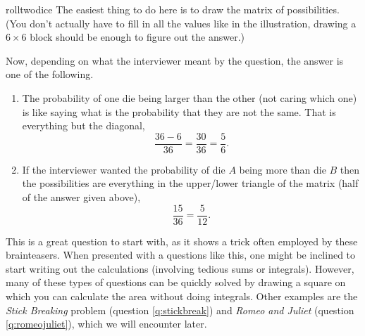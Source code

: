 \begin{answer}{rolltwodice}
The easiest thing to do here is to draw the matrix of possibilities.
(You don't actually have to fill in all the values like in the illustration, drawing a $6 \times 6$ block should be enough to figure out the answer.)
%
\begin{center}
\end{center}
%
Now, depending on what the interviewer meant by the question, the answer is one of the following.
\begin{enumerate}
  \item
The probability of one die being larger than the other (not caring which one) is like saying what is the probability that they are not the same.
That is everything but the diagonal,
\[
  \frac{36- 6}{36} =  \frac{30}{36} = \frac{5}{6}
  \text{.}
\]
  \item
If the interviewer wanted the probability of die $A$ being more than die $B$ then the possibilities are everything in the upper/lower triangle of the matrix (half of the answer given above),
\[
  \frac{15}{36} = \frac{5}{12}
  \text{.}
\]
\end{enumerate}

This is a great question to start with, as it shows a trick often employed by these brainteasers.
When presented with a questions like this, one might be inclined to start writing out the calculations (involving tedious sums or integrals).
However, many of these types of questions can be quickly solved by drawing a square on which you can calculate the area without doing integrals.
Other examples are the
\emph{Stick Breaking} problem (question \ref{q:stickbreak})
and
\emph{Romeo and Juliet} (question \ref{q:romeojuliet}),
which we will encounter later.


\end{answer}
